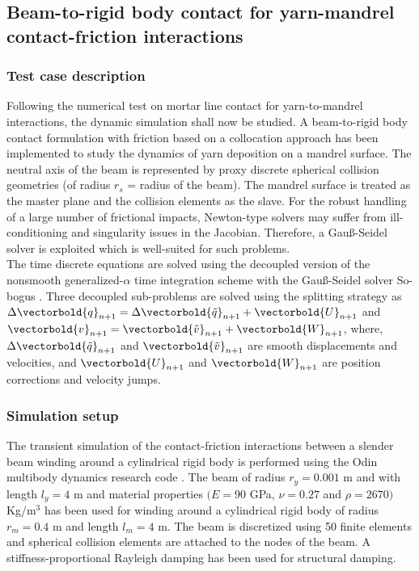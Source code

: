 \subsection{Beam-to-rigid body contact for yarn-mandrel contact-friction interactions}
\subsubsection{Test case description}
Following the numerical test on mortar line contact for yarn-to-mandrel interactions, the dynamic simulation shall now be studied. A beam-to-rigid body contact formulation with friction based on a collocation approach has been implemented to study the dynamics of yarn deposition on a mandrel surface. The neutral axis of the beam is represented by proxy discrete spherical collision geometries \cite{tasora2020geometrically} (of radius $r_s$ = radius of the beam). The mandrel surface is treated as the master plane and the collision elements as the slave. For the robust handling of a large number of frictional impacts, Newton-type solvers may suffer from ill-conditioning and singularity issues in the Jacobian. Therefore, a Gau{\ss}-Seidel solver is exploited which is well-suited for such problems.\\

The time discrete equations are solved using the decoupled version of the nonsmooth generalized-$\alpha$ time integration scheme \cite{cosimo2020robust} with the Gau{\ss}-Seidel solver So-bogus \cite{daviet2011hybrid}. Three decoupled sub-problems are solved using the splitting strategy as $\Delta \vectorbold{q}_{n+1} = \Delta \vectorbold{\Tilde{q}}_{n+1} + \vectorbold{U}_{n+1}$ and $\vectorbold{v}_{n+1} = \vectorbold{\Tilde{v}}_{n+1} + \vectorbold{W}_{n+1}$, where, $\Delta \vectorbold{\Tilde{q}}_{n+1}$ and $\vectorbold{\Tilde{v}}_{n+1}$ are smooth displacements and velocities, and $\vectorbold{U}_{n+1}$ and $\vectorbold{W}_{n+1}$ are position corrections and velocity jumps. 

\subsubsection{Simulation setup}
The transient simulation of the contact-friction interactions between a slender beam winding around a cylindrical rigid body is performed using the Odin multibody dynamics research code \cite{odin2022}. The beam of radius $r_y = 0.001$ m and with length $l_y = 4$ m and material properties $(E = 90$ GPa, $\nu = 0.27$ and $\rho = 2670)$ Kg/m$^3$ has been used for winding around a cylindrical rigid body of radius  $r_m = 0.4$ m and length $l_m = 4$ m. The beam is discretized using 50 finite elements and spherical collision elements are attached to the nodes of the beam. A stiffness-proportional Rayleigh damping has been used for structural damping. \\
 


